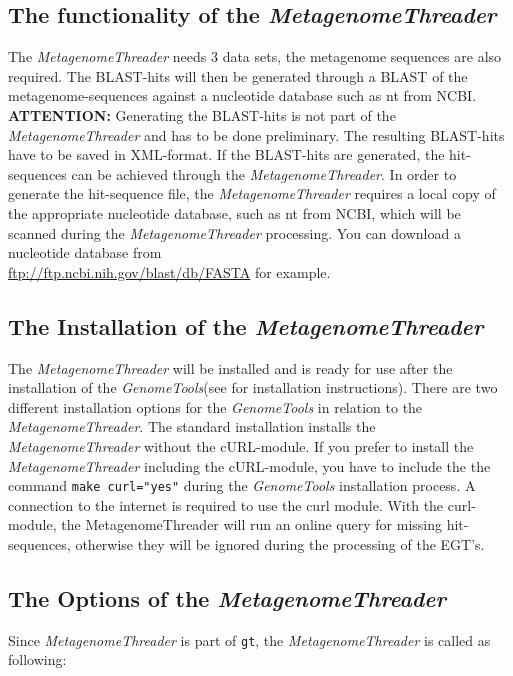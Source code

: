 \documentclass[12pt,titlepage]{article}
\newcommand{\MetagenomeThreader}{\textit{MetagenomeThreader}\xspace}
\newcommand{\GenomeTools}{\textit{GenomeTools}\xspace}
\newcommand{\Gt}{\texttt{gt}\xspace}
\newcommand{\Attention}{\textbf{ATTENTION:}\xspace}
\begin{document}
\subsection{The functionality of the \MetagenomeThreader} \label{Functional}

The \MetagenomeThreader needs 3 data sets, the metagenome
sequences are also required. The BLAST-hits will then be generated through a BLAST of
the metagenome-sequences against a nucleotide database such as nt from NCBI.
\Attention Generating the BLAST-hits is not part of the \MetagenomeThreader and
has to be done preliminary. The resulting BLAST-hits have to be saved in XML-format.
If the BLAST-hits are generated, the hit-sequences can be achieved through the
\MetagenomeThreader. In order to generate the hit-sequence file, the \MetagenomeThreader
requires a local copy of the appropriate nucleotide database, such as nt from NCBI, which will be scanned
during the \MetagenomeThreader processing. You can download a nucleotide database
from
\\
{\url{ftp://ftp.ncbi.nih.gov/blast/db/FASTA}} for example.

\subsection{The Installation of the \MetagenomeThreader} \label{Install}

The \MetagenomeThreader will be installed and is ready for use after the
installation of the \GenomeTools (see \cite{genometools} for installation instructions).
There are two different installation options for the \GenomeTools in relation to the \MetagenomeThreader.
The standard installation installs the
\\
\MetagenomeThreader without the cURL-module.
If you prefer to install the \MetagenomeThreader including the cURL-module, you have to include the
the command \texttt{make curl="yes"} during the \GenomeTools installation process.
A connection to the internet is required to use the curl module.
With the curl-module, the MetagenomeThreader will run an online query for
missing hit-sequences, otherwise they will be ignored during the processing of the EGT's.

\subsection{The Options of the \MetagenomeThreader} \label{Overview}

Since \MetagenomeThreader is part of \Gt, the \MetagenomeThreader is called as following:
\end{document}
